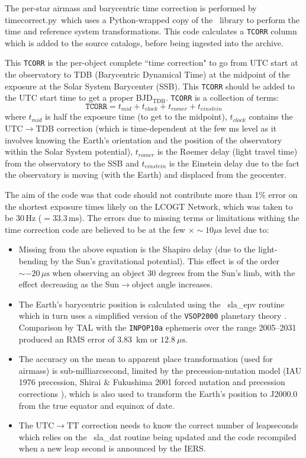 \documentclass[twoside,11pt,nolof]{starlink}
\providecommand{\SLALIB}{\xref{\textsc{{SLALIB}}}{sun67}{}}
\providecommand{\task}[1]{\textsf{#1}}
\providecommand{\ndfcomp}[1]{\texttt{#1}}    %
\providecommand{\LCONet}{LCOGT Network}
\providecommand{\rmn}[1] {\mathrm{#1}}
\begin{document}
The per-star airmass and barycentric time correction is performed by
\task{timecorrect.py}\ which uses a Python-wrapped copy of the \SLALIB\ library
to perform the time and reference system transformations. This code calculates a
\ndfcomp{TCORR} column which is added to the source catalogs, before being
ingested into the archive. 

This \ndfcomp{TCORR} is the per-object complete ``time correction" to go from UTC start at the
observatory to TDB (Barycentric Dynamical Time) at the midpoint of the exposure
at the Solar System Barycenter (SSB). This \ndfcomp{TCORR} should be added to the UTC
start time to get a proper BJD$_\rmn{TDB}$. \ndfcomp{TCORR} is a collection of terms:
\begin{equation}
\texttt{TCORR} = t_{mid}+t_{clock}+t_{romer}+t_{einstein}
\end{equation}
where $t_{mid}$ is half the exposure time (to get to the midpoint), $t_{clock}$
contains the $\rmn{UTC}\rightarrow\rmn{TDB}$ correction (which is time-dependent at the few ms level as
it involves knowing the Earth's orientation and the position of the observatory
within the Solar System potential), $t_{romer}$ is the R\o emer delay (light travel
time) from the observatory to the SSB and $t_{einstein}$ is the Einstein delay due
to the fact the observatory is moving (with the Earth) and displaced from the geocenter.

The aim of the code was that code should not contribute more than 1\% error on
the shortest exposure times likely on the \LCONet, which was taken to be 30\,Hz
($=33.3\,\rmn{ms}$). The errors due to missing terms or limitations withing the
time correction code are believed to be at the few $\times\sim10\mu\rmn{s}$
level due to:
\begin{itemize}
\item Missing from the above equation is the Shapiro delay (due to the light-bending
by the Sun's gravitational potential). This effect is of the order $\sim-20\,\mu\rmn{s}$
when observing an object 30 degrees from the Sun's limb, with the effect decreasing as the
Sun$\rightarrow$object angle increases.
\item The Earth's barycentric position is calculated using the \SLALIB\
\task{sla\_epv} routine which in turn uses a simplified version of the
\texttt{VSOP2000} planetary theory \cite{vsop2000}. Comparison by TAL with the
\texttt{INPOP10a} ephemeris \cite{inpop10a} over the range 2005--2031 produced
an RMS error of 3.83\ km or $12.8\ \mu\rmn{s}$.
\item The accuracy on the mean to apparent place transformation (used for
airmass) is sub-milliarcsecond, limited by the precession-nutation model (IAU
1976 precession, Shirai \& Fukushima 2001 forced nutation and precession
corrections \cite{sf2001}), which is also used to transform the Earth's position to
J2000.0 from the true equator and equinox of date.
\item The $\rmn{UTC}\rightarrow\rmn{TT}$ correction needs to know the correct
number of leapseconds which relies on the \SLALIB\ \task{sla\_dat} routine being
updated and the code recompiled when a new leap second is announced by the IERS.
\end{itemize}
\end{document}
